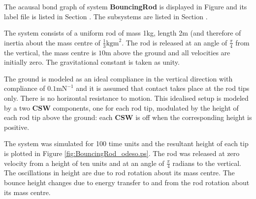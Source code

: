 
%

The acausal bond graph of system \textbf{BouncingRod} is displayed in
Figure  and its label file is listed in Section
. 
 The subsystems are listed in Section
.

The system consists of a uniform rod of mass 1kg, length 2m (and
therefore of inertia about the mass centre of $\frac{1}{3}
\text{kgm}^2$. The rod is released at an angle of $\frac{\pi}{4}$ from
the vertical, the mass centre is $10\text{m}$ above the ground and all
velocities are initially zero. The gravitational constant is taken as unity.

The ground is modeled as an ideal compliance in the vertical
direction with compliance of $0.1 \text{mN}^{-1}$ and it is assumed
that contact takes place at the rod tips only. There is no
horizontal resistance to motion. This idealised setup is modeled by a
two {\bf CSW} components, one for each rod tip, modulated by the
height of each rod tip above the ground: each  {\bf CSW} is off when
the corresponding height is positive.

The system was simulated for 100 time units and the resultant height
of each tip is plotted in Figure \ref{fig:BouncingRod_odeso.ps}. The rod was
released at zero velocity from a height of ten units and at an angle
of $\frac{\pi}{4}$ radians to the vertical. The oscillations in height
are due to rod rotation about its mass centre.  The bounce height
changes due to energy transfer to and from the rod rotation about its
mass centre.




